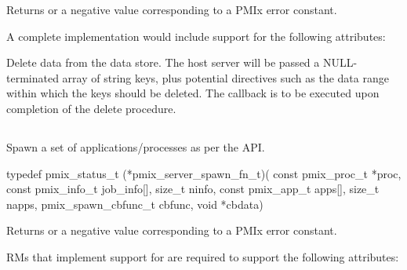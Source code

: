 Returns  or a negative value corresponding to a PMIx error constant.

\optattr
A complete implementation would include support for the following attributes:


\descr

Delete data from the data store.
The host server will be passed a NULL-terminated array of string keys, plus potential directives such as the data range within which the keys should be deleted.
The callback is to be executed upon completion of the delete procedure.


\subsection{}

\summary

Spawn a set of applications/processes as per the  API.

\format

\cspecificstart
\begin{codepar}
typedef pmix_status_t (*pmix_server_spawn_fn_t)(
                             const pmix_proc_t *proc,
                             const pmix_info_t job_info[], size_t ninfo,
                             const pmix_app_t apps[], size_t napps,
                             pmix_spawn_cbfunc_t cbfunc, void *cbdata)
\end{codepar}
\cspecificend

\begin{arglist}
\end{arglist}

Returns  or a negative value corresponding to a PMIx error constant.

\reqattr
\acp{RM} that implement support for  are required to support the following attributes:

